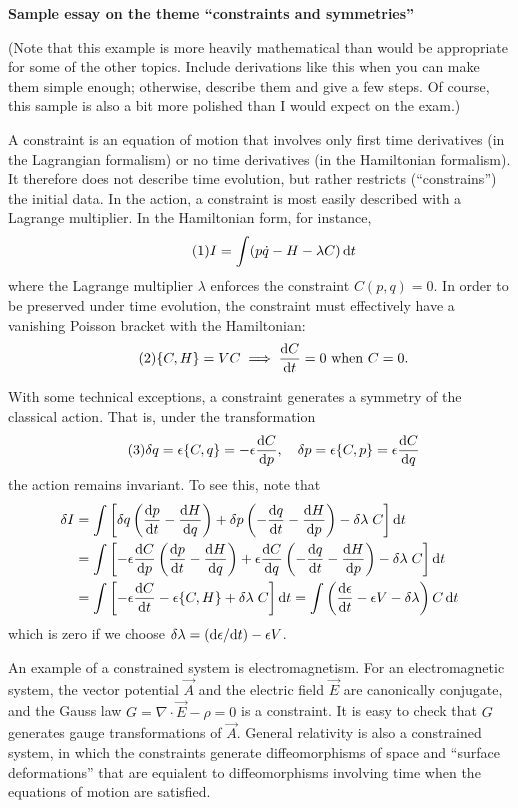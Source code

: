 \noindent\textbf{Sample essay on the theme ``constraints and
  symmetries''}

(Note that this example is more heavily mathematical than would be
appropriate for some of the other topics. Include derivations like this
when you can make them simple enough; otherwise, describe them and give
a few steps. Of course, this sample is also a bit more polished than I
would expect on the exam.)

A constraint is an equation of motion that involves only first time
derivatives (in the Lagrangian formalism) or no time derivatives (in the
Hamiltonian formalism). It therefore does not describe time evolution,
but rather restricts (``constrains'') the initial data. In the action, a
constraint is most easily described with a Lagrange multiplier. In the
Hamiltonian form, for instance,
\begin{equation*}\tag{1}
I = \int(p\dot{q}-H-\lambda C)\,\mathrm{d} t
\end{equation*}
where the Lagrange multiplier $\lambda$ enforces the constraint
$C(p,q)=0$. In order to be preserved under time evolution, the
constraint must effectively have a vanishing Poisson bracket with the
Hamiltonian:
\begin{equation*}\tag{2}
\{C,H\}=VC \implies \frac{\mathrm{d} C}{\mathrm{d} t}=0\mbox{ when }C=0.
\end{equation*}

With some technical exceptions, a constraint generates a symmetry of the
classical action. That is, under the transformation
\begin{equation*}\tag{3}
  \delta q=\epsilon\{C,q\}=-\epsilon\frac{\mathrm{d} C}{\mathrm{d} p},\quad
  \delta p=\epsilon\{C,p\}=\epsilon\frac{\mathrm{d} C}{\mathrm{d} q}
\end{equation*}
the action remains invariant. To see this, note that
\begin{align*}
\delta I
&= \int\left[\delta q\left(\frac{\mathrm{d} p}{\mathrm{d} t}-\frac{\mathrm{d} H}{\mathrm{d} q}\right)
  + \delta p\left(-\frac{\mathrm{d} q}{\mathrm{d} t}-\frac{\mathrm{d} H}{\mathrm{d} p}\right) -
 \delta\lambda\;C\right]\mathrm{d} t\\
&= \int\left[-\epsilon\frac{\mathrm{d} C}{\mathrm{d} p}\left(\frac{\mathrm{d} p}{\mathrm{d} t}-\frac{\mathrm{d} H}{\mathrm{d} q}\right)
  + \epsilon\frac{\mathrm{d} C}{\mathrm{d} q}\left(-\frac{\mathrm{d} q}{\mathrm{d} t}-\frac{\mathrm{d} H}{\mathrm{d} p}\right) -
 \delta\lambda\;C\right]\mathrm{d} t\\
&= \int\left[-\epsilon\frac{\mathrm{d} C}{\mathrm{d} t} - \epsilon\{C,H\} + \delta\lambda\;C\right]\mathrm{d} t
= \int\left(\frac{\mathrm{d}\epsilon}{\mathrm{d} t}-\epsilon V -
\delta\lambda\right)C\,\mathrm{d} t
\end{align*}
which is zero if we choose $\delta\lambda = (\mathrm{d}\epsilon/\mathrm{d} t) - \epsilon V$.

An example of a constrained system is electromagnetism. For an
electromagnetic system, the vector potential $\vec{A}$ and the electric
field $\vec{E}$ are canonically conjugate, and the Gauss law
$G=\nabla\cdot\vec{E}-\rho=0$ is a constraint. It is easy to check that
$G$ generates gauge transformations of $\vec{A}$. General relativity is
also a constrained system, in which the constraints generate
diffeomorphisms of space and ``surface deformations'' that are equialent
to diffeomorphisms involving time when the equations of motion are satisfied.
